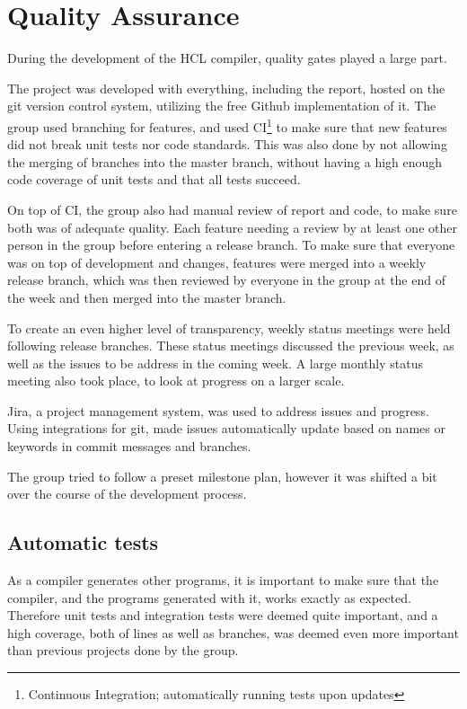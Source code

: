 \section{Quality Assurance}
During the development of the HCL compiler, quality gates played a large part.

The project was developed with everything, including the report, hosted on the git\cite{GitProtocol} version control system, utilizing the free Github implementation of it.
The group used branching for features, and used CI\footnote{Continuous Integration; automatically running tests upon updates} to make sure that new features did not break unit tests nor code standards.
This was also done by not allowing the merging of branches into the master branch, without having a high enough code coverage of unit tests and that all tests succeed.

On top of CI, the group also had manual review of report and code, to make sure both was of adequate quality. 
Each feature needing a review by at least one other person in the group before entering a release branch.
To make sure that everyone was on top of development and changes, features were merged into a weekly release branch, which was then reviewed by everyone in the group at the end of the week and then merged into the master branch.

To create an even higher level of transparency, weekly status meetings were held following release branches.
These status meetings discussed the previous week, as well as the issues to be address in the coming week. 
A large monthly status meeting also took place, to look at progress on a larger scale. 

Jira\cite{Jira}, a project management system, was used to address issues and progress.
Using integrations for git, made issues automatically update based on names or keywords in commit messages and branches.

The group tried to follow a preset milestone plan, however it was shifted a bit over the course of the development process.

\subsection{Automatic tests}

As a compiler generates other programs, it is important to make sure that the compiler, and the programs generated with it, works exactly as expected.
Therefore unit tests and integration tests were deemed quite important, and a high coverage, both of lines as well as branches, was deemed even more important than previous projects done by the group. 

